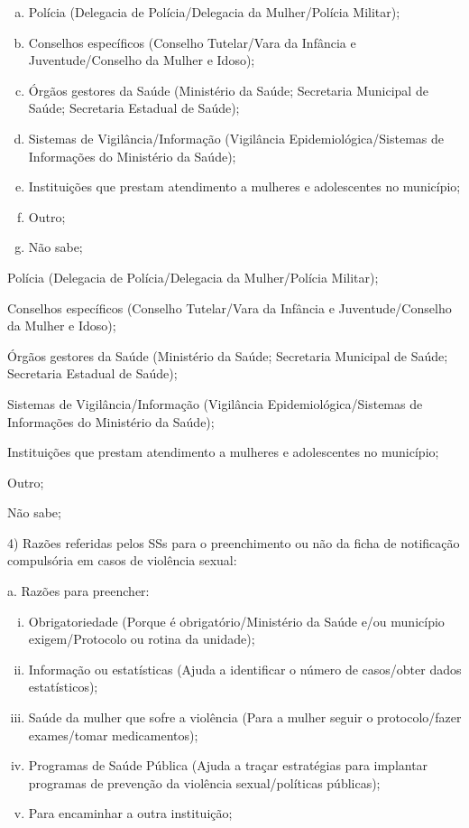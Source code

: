 \documentclass{article}
\begin{document}
\begin{enumerate}[a)]
\item
Polícia (Delegacia de Polícia/Delegacia da Mulher/Polícia Militar);

\item
Conselhos específicos (Conselho Tutelar/Vara da Infância e Juventude/Conselho da
Mulher e Idoso);

\item
Órgãos gestores da Saúde (Ministério da Saúde; Secretaria Municipal de Saúde;
Secretaria Estadual de Saúde);

\item
Sistemas de Vigilância/Informação (Vigilância Epidemiológica/Sistemas de
Informações do Ministério da Saúde);

\item
Instituições que prestam atendimento a mulheres e adolescentes no município;

\item
Outro;

\item
Não sabe;

\end{enumerate}

Polícia (Delegacia de Polícia/Delegacia da Mulher/Polícia Militar);

Conselhos específicos (Conselho Tutelar/Vara da Infância e Juventude/Conselho da
Mulher e Idoso);

Órgãos gestores da Saúde (Ministério da Saúde; Secretaria Municipal de Saúde;
Secretaria Estadual de Saúde);

Sistemas de Vigilância/Informação (Vigilância Epidemiológica/Sistemas de
Informações do Ministério da Saúde);

Instituições que prestam atendimento a mulheres e adolescentes no município;

Outro;

Não sabe;

4) Razões referidas pelos SSs para o preenchimento ou não da ficha de
notificação compulsória em casos de violência sexual:

a. Razões para preencher:

\begin{enumerate}[i.]
\item
Obrigatoriedade (Porque é obrigatório/Ministério da Saúde e/ou município
exigem/Protocolo ou rotina da unidade);

\item
Informação ou estatísticas (Ajuda a identificar o número de casos/obter dados
estatísticos);

\item
Saúde da mulher que sofre a violência (Para a mulher seguir o protocolo/fazer
exames/tomar medicamentos);

\item
Programas de Saúde Pública (Ajuda a traçar estratégias para implantar programas
de prevenção da violência sexual/políticas públicas);

\item
Para encaminhar a outra instituição;

\end{enumerate}
\end{document}
